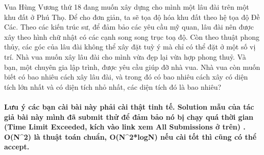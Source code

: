 Vua Hùng Vương thứ 18 đang muốn xây dựng cho mình một lâu đài trên một khu đất ở Phú Thọ. Để cho đơn giản, ta sẽ tọa độ hóa khu đất theo hệ tọa độ Đề Các. Theo các kiến trúc sư, để đảm bảo các yêu cầu mỹ quan, lâu đài nên được xây theo hình chữ nhật có các cạnh song song trục toạ độ. Còn theo thuật phong thủy, các góc của lâu đài không thể xây đặt tuỳ ý mà chỉ có thể đặt ở một số vị trí. Nhà vua muốn xây lâu đài cho mình vừa đẹp lại vừa hợp phong thuỷ. Và bạn, một chuyên gia lập trình, được yêu cầu giúp đỡ nhà vua. Nhà vua còn muốn biết có bao nhiêu cách xây lâu đài, và trong đó có bao nhiêu cách xây có diện tích lớn nhất và có diện tích nhỏ nhất, các diện tích đó là bao nhiêu?

\paragraph{Lưu ý các bạn cài bài này phải cài thật tinh tế. Solution mẫu của tác giả bài này mình đã submit thử để đảm bảo nó bị chạy quá thời gian (Time Limit Exceeded, kích vào link xem All Submissions ở trên) . O(N^2) là thuật toán chuẩn, O(N^2*logN) nếu cài tốt thì cũng có thể accept.}